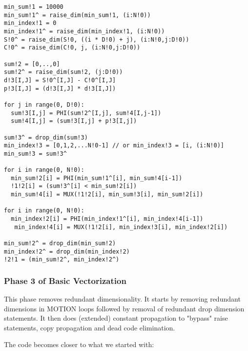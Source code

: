 {\small
\begin{verbatim}
min_sum!1 = 10000
min_sum!1^ = raise_dim(min_sum!1, (i:N!0))
min_index!1 = 0
min_index!1^ = raise_dim(min_index!1, (i:N!0))
S!0^ = raise_dim(S!0, ((i * D!0) + j), (i:N!0,j:D!0))
C!0^ = raise_dim(C!0, j, (i:N!0,j:D!0))

sum!2 = [0,..,0]
sum!2^ = raise_dim(sum!2, (j:D!0))
d!3[I,J] = S!0^[I,J] - C!0^[I,J]
p!3[I,J] = (d!3[I,J] * d!3[I,J])

for j in range(0, D!0):
  sum!3[I,j] = PHI(sum!2^[I,j], sum!4[I,j-1])       
  sum!4[I,j] = (sum!3[I,j] + p!3[I,j])

sum!3^ = drop_dim(sum!3)     
min_index!3 = [0,1,2,...N!0-1] // or min_index!3 = [i, (i:N!0)]
min_sum!3 = sum!3^

for i in range(0, N!0):
  min_sum!2[i] = PHI(min_sum!1^[i], min_sum!4[i-1]) 
  !1!2[i] = (sum!3^[i] < min_sum!2[i])
  min_sum!4[i] = MUX(!1!2[i], min_sum!3[i], min_sum!2[i])
    
for i in range(0, N!0):
  min_index!2[i] = PHI(min_index!1^[i], min_index!4[i-1])  
   min_index!4[i] = MUX(!1!2[i], min_index!3[i], min_index!2[i])

min_sum!2^ = drop_dim(min_sum!2)
min_index!2^ = drop_dim(min_index!2)   
!2!1 = (min_sum!2^, min_index!2^)
\end{verbatim}
}



\subsubsection{Phase 3 of Basic Vectorization}

This phase removes redundant dimensionality. 
It starts by removing redundant dimensions in MOTION loops followed
by removal of redundant drop dimension statements.
It then does (extended) constant propagation 
to "bypass" raise statements, copy propagation
and dead code elimination.

The code becomes closer to what we started with:


